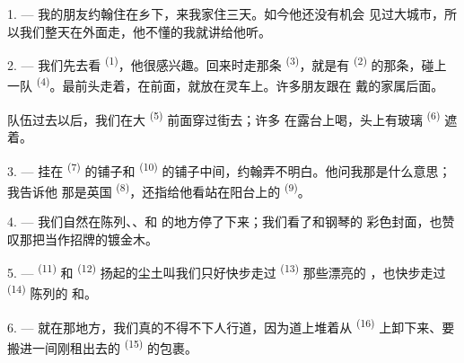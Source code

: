 
\VUsaut{4.0mm}
\VUsaut{3.0mm}

\VUsaut{3.0mm}

1. --- 我的朋友约翰住在乡下，来我家住三天。如今他还没有机会
见过大城市，所以我们整天在外面走，他不懂的我就讲给他听。

2. --- 我们先去看 \textsuperscript{(1)}，他很感兴趣。回来时走那条
\textsuperscript{(3)}，就是有 \textsuperscript{(2)} 的那条，碰上
一队 \textsuperscript{(4)}。最前头走着，在前面，就放在灵车上。许多朋友跟在
戴的家属后面。

队伍过去以后，我们在大 \textsuperscript{(5)} 前面穿过街去；许多
在露台上喝，头上有玻璃 \textsuperscript{(6)}
遮着。

3. --- 挂在 \textsuperscript{(7)} 的铺子和
\textsuperscript{(10)} 的铺子中间，约翰弄不明白。他问我那是什么意思；我告诉他
那是英国 \textsuperscript{(8)}，还指给他看站在阳台上的
\textsuperscript{(9)}。

\VUsaut{3.0mm}

4. --- 我们自然在陈列、、和
的地方停了下来；我们看了和钢琴的
彩色封面，也赞叹那把当作招牌的镀金木。

5. ---  \textsuperscript{(11)} 和 \textsuperscript{(12)}
扬起的尘土叫我们只好快步走过 \textsuperscript{(13)} 那些漂亮的
，也快步走过 \textsuperscript{(14)} 陈列的
和。

6. --- 就在那地方，我们真的不得不下人行道，因为道上堆着从
\textsuperscript{(16)} 上卸下来、要搬进一间刚租出去的 \textsuperscript{(15)}
的包裹。


